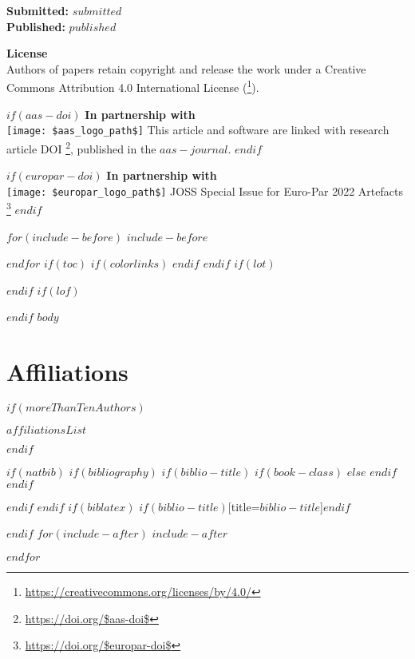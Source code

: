 \documentclass[10pt,a4paper,onecolumn]{article}
\renewcommand\Affilfont{\sffamily\small\mdseries}
\renewcommand{\href}[2]{#2\footnote{\url{#1}}}
\begin{document}
{\begin{flushleft}
  {\bfseries Submitted:} $submitted$\\
  {\bfseries Published:} $published$

  \vspace{2mm}
  {\bfseries License}\\
  Authors of papers retain copyright and release the work under a Creative Commons Attribution 4.0 International License (\href{https://creativecommons.org/licenses/by/4.0/}{\color{red}{CC BY 4.0}}).

  $if(aas-doi)$
  \vspace{4mm}
  {\bfseries In partnership with}\\
  \vspace{2mm}
  \texttt{[image: \$aas\_logo\_path\$]}
  \vspace{2mm}
  \newline
  This article and software are linked with research article DOI \href{https://doi.org/$aas-doi$}{\color{linky}{$aas-doi$}}, published in the $aas-journal$.
  $endif$

  $if(europar-doi)$
  \vspace{4mm}
  {\bfseries In partnership with}\\
  \vspace{2mm}
  \texttt{[image: \$europar\_logo\_path\$]}
  \vspace{2mm}
  \newline
  JOSS Special Issue for Euro-Par 2022 Artefacts \href{https://doi.org/$europar-doi$}{\color{linky}{$europar-doi$}}
  $endif$

  \end{flushleft}
}

$for(include-before)$
$include-before$

$endfor$
$if(toc)$
{
$if(colorlinks)$
\hypersetup{linkcolor=$if(toccolor)$$toccolor$$else$black$endif$}
$endif$
\setcounter{tocdepth}{$toc-depth$}
\tableofcontents
}
$endif$
$if(lot)$
\listoftables
$endif$
$if(lof)$
\listoffigures
$endif$
$body$

\section{Affiliations}

$if(moreThanTenAuthors)$

{\Affilfont $affiliationsList$}

$endif$

$if(natbib)$
$if(bibliography)$
$if(biblio-title)$
$if(book-class)$
\renewcommand\bibname{$biblio-title$}
$else$
\renewcommand\refname{$biblio-title$}
$endif$
$endif$


$endif$
$endif$
$if(biblatex)$
\printbibliography$if(biblio-title)$[title=$biblio-title$]$endif$

$endif$
$for(include-after)$
$include-after$

$endfor$
\end{document}
